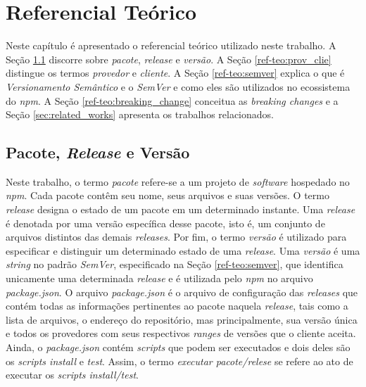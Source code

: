 \chapter{Referencial Teórico}
\label{cap:ref-teorico}
Neste capítulo é apresentado o referencial teórico utilizado neste trabalho. A Seção \ref{ref-teo:pac_rel_ver} discorre sobre \textit{pacote}, \textit{release} e \textit{versão}. A Seção \ref{ref-teo:prov_clie} distingue os termos \textit{provedor} e \textit{cliente}. A Seção \ref{ref-teo:semver} explica o que é \textit{Versionamento Semântico} e o \textit{SemVer} e como eles são utilizados no ecossistema do \textit{npm}. A Seção \ref{ref-teo:breaking_change} conceitua as \textit{breaking changes} e a Seção \ref{sec:related_works} apresenta os trabalhos relacionados.

\section{Pacote, \textit{Release} e Versão}
\label{ref-teo:pac_rel_ver}
Neste trabalho, o termo \textit{pacote} refere-se a um projeto de \textit{software} hospedado no \textit{npm}. Cada pacote contêm seu nome, seus arquivos e suas versões. O termo \textit{release} designa o estado de um pacote em um determinado instante. Uma \textit{release} é denotada por uma versão específica desse pacote, isto é, um conjunto de arquivos distintos das demais \textit{releases}. Por fim, o termo \textit{versão} é utilizado para especificar e distinguir um determinado estado de uma \textit{release}. Uma \textit{versão} é uma \textit{string} no padrão \textit{SemVer}, especificado na Seção \ref{ref-teo:semver}, que identifica unicamente uma determinada \textit{release} e é utilizada pelo \textit{npm} no arquivo \textit{package.json}. O arquivo \textit{package.json} é o arquivo de configuração das \textit{releases} que contém todas as informações pertinentes ao pacote naquela \textit{release}, tais como a lista de arquivos, o endereço do repositório, mas principalmente, sua versão única e todos os provedores com seus respectivos \textit{ranges} de versões que o cliente aceita. Ainda, o \textit{package.json} contém \textit{scripts} que podem ser executados e dois deles são os \textit{scripts install} e \textit{test}. Assim, o termo \textit{executar pacote/relese} se refere ao ato de executar os \textit{scripts install/test}.


